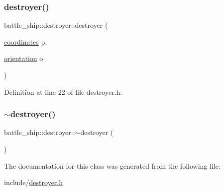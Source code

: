 \mbox{\label{classbattle__ship_1_1destroyer_af0f630a4ecc4d6667b6adf021633da83}} 
\subsubsection{\texorpdfstring{destroyer()}{destroyer()}\hspace{0.1cm}{\footnotesize\ttfamily [2/2]}}
{\footnotesize\ttfamily battle\+\_\+ship\+::destroyer\+::destroyer (\begin{DoxyParamCaption}\item[{\hyperlink{structbattle__ship_1_1coordinates}{coordinates}}]{p,  }\item[{\hyperlink{namespacebattle__ship_aed87488f0a73f0d0679fe343fb61c784}{orientation}}]{o }\end{DoxyParamCaption})\hspace{0.3cm}{\ttfamily [inline]}}



Definition at line 22 of file destroyer.\+h.

\mbox{\label{classbattle__ship_1_1destroyer_a6abbf5c8970c69703ae57786e2247f9a}} 
\subsubsection{\texorpdfstring{$\sim$destroyer()}{~destroyer()}}
{\footnotesize\ttfamily battle\+\_\+ship\+::destroyer\+::$\sim$destroyer (\begin{DoxyParamCaption}{ }\end{DoxyParamCaption})\hspace{0.3cm}{\ttfamily [default]}}



The documentation for this class was generated from the following file\+:\begin{DoxyCompactItemize}
\item 
include/\hyperlink{destroyer_8h}{destroyer.\+h}\end{DoxyCompactItemize}

